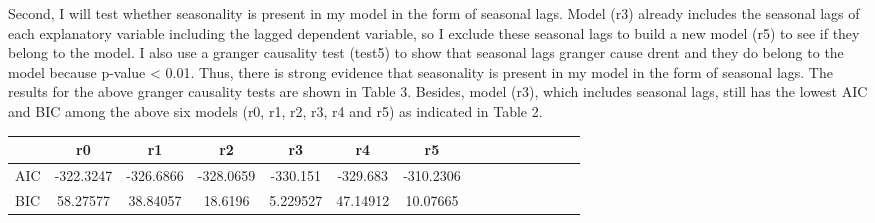 \documentclass[12pt, times]{article}
\renewcommand{\baselinestretch}{1.5}
\begin{document}
\hspace{1.5em}Second, I will test whether seasonality is present in my model in the form of seasonal lags. Model (r3) already includes the seasonal lags of each explanatory variable including the lagged dependent variable, so I exclude these seasonal lags to build a new model (r5) to see if they belong to the model. I also use a granger causality test (test5) to show that seasonal lags granger cause drent and they do belong to the model because p-value < 0.01. Thus, there is strong evidence that seasonality is present in my model in the form of seasonal lags. The results for the above granger causality tests are shown in Table 3. Besides, model (r3), which includes seasonal lags, still has the lowest AIC and BIC among the above six models (r0, r1, r2, r3, r4 and r5) as indicated in Table 2.

\renewcommand{\baselinestretch}{0.5}
\label{1}
\begin{scriptsize}
  \begin{center}
    \tabcolsep 15pt
    \begin{tabular}{lcccccccccccccc}
      \toprule
          & r0        & r1        & r2        & r3       & r4       & r5        \\
      \midrule
      AIC & -322.3247 & -326.6866 & -328.0659 & -330.151 & -329.683 & -310.2306
      \\
      BIC & 58.27577  & 38.84057  & 18.6196   & 5.229527 & 47.14912 & 10.07665  \\
      \bottomrule
    \end{tabular}
  \end{center}
\end{scriptsize}
\end{document}

